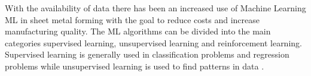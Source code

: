 







With the availability of data there has been an increased use of Machine Learning \ac{ML} in sheet metal forming with the goal to reduce costs and increase manufacturing quality.
\cite{bock_reviewapplicationmachine_2019} \cite[]{cao_manufacturingadvancedsmart_2019} %
The ML algorithms can be divided into the main categories supervised learning, unsupervised learning and reinforcement learning. \cite[]{liu_reinforcementlearningfreeform_2020}
Supervised learning is generally used in classification problems and regression problems while unsupervised learning is used to find patterns in data \cite[p. 2]{cruz_applicationmachinelearning_2021}.

